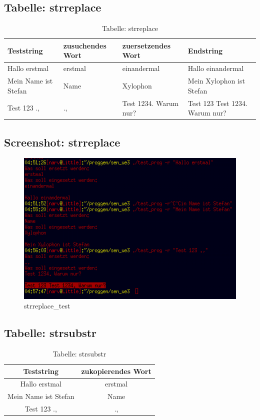 \documentclass{scrartcl}
\begin{document}
\newpage
\subsection{Tabelle: strreplace}
\begin{table}[H]
  \centering
  \begin{tabular}{|p{}|p{}|p{4cm}|p{4cm}|}
    \hline
    Teststring & zusuchendes Wort & zuersetzendes Wort & Endstring \\
    \hline
    Hallo erstmal & erstmal & einandermal & Hallo einandermal \\
    \hline
    Mein Name ist Stefan & Name & Xylophon & Mein Xylophon ist Stefan  \\
    \hline
    Test 123 ., & ., & Test 1234. Warum nur? & Test 123 Test 1234. Warum nur?  \\
    \hline
  \end{tabular}
  \caption{Tabelle: strreplace}
\end{table}
\subsection{Screenshot: strreplace}
\begin{figure}[H]
  \centering
  \includegraphics[width=0.9\linewidth]{images/strreplace_test.png}
  \caption{strreplace\_test}
  \label{fig:digraph}
\end{figure}

\newpage
\subsection{Tabelle: strsubstr}
\begin{table}[H]
  \centering
  \begin{tabular}{|c|c|}
    \hline
    Teststring & zukopierendes Wort \\
    \hline
    Hallo erstmal & erstmal \\
    \hline
    Mein Name ist Stefan & Name \\
    \hline
    Test 123 ., & ., \\
    \hline
  \end{tabular}
  \caption{Tabelle: strsubstr}
\end{table}
\end{document}
